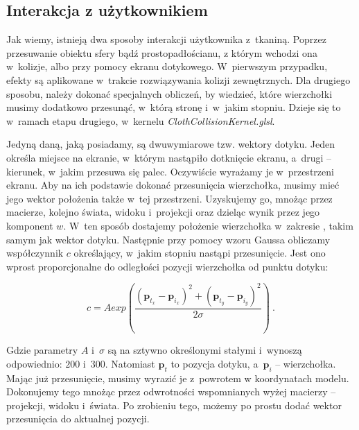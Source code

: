 		\subsection{Interakcja z użytkownikiem}
		\label{t:symulacja:dzialanie:interakcja}
			
		
		Jak wiemy, istnieją dwa sposoby interakcji użytkownika z~tkaniną. Poprzez przesuwanie obiektu sfery bądź prostopadłościanu, z którym wchodzi ona w~kolizje, albo przy pomocy ekranu dotykowego. W~pierwszym przypadku, efekty są aplikowane w~trakcie rozwiązywania kolizji zewnętrznych. Dla drugiego sposobu, należy dokonać specjalnych obliczeń, by wiedzieć, które wierzchołki musimy dodatkowo przesunąć, w~którą stronę i~w~jakim stopniu. Dzieje się to w~ramach etapu drugiego, w~kernelu \emph{ClothCollisionKernel.glsl}.
		
		Jedyną daną, jaką posiadamy, są dwuwymiarowe tzw. wektory dotyku. Jeden określa miejsce na ekranie, w~którym nastąpiło dotknięcie ekranu, a~drugi -- kierunek, w~jakim przesuwa się palec. Oczywiście wyrażamy je w~przestrzeni ekranu. Aby na ich podstawie dokonać przesunięcia wierzchołka, musimy mieć jego wektor położenia także w~tej przestrzeni. Uzyskujemy go, mnożąc przez macierze, kolejno świata, widoku i~projekcji oraz dzieląc wynik przez jego komponent \(w\). W~ten sposób dostajemy położenie wierzchołka w~zakresie \(<-1, 1>\), takim samym jak wektor dotyku. Następnie przy pomocy wzoru Gaussa obliczamy współczynnik \(c\) określający, w~jakim stopniu nastąpi przesunięcie. Jest ono wprost proporcjonalne do odległości pozycji wierzchołka od punktu dotyku:
		
		
		\begin{equation}
		c = Aexp(\frac{(\mathbf{p}_{t_{x}} - \mathbf{p}_{i_{x}})^{2} + (\mathbf{p}_{t_{y}} - \mathbf{p}_{i_{y}})^{2}}{2 \sigma}) \ .
		\end{equation} 
		
		Gdzie parametry \( A \) i~\( \sigma \) są na sztywno określonymi stałymi i~wynoszą odpowiednio: \(200\) i~\(300\). Natomiast \( \mathbf{p}_{t} \) to pozycja dotyku, a~\( \mathbf{p}_{i} \)  -- wierzchołka. Mając już przesunięcie, musimy wyrazić je z~powrotem w koordynatach modelu. Dokonujemy tego mnożąc przez odwrotności wspomnianych wyżej macierzy -- projekcji, widoku i~świata. Po zrobieniu tego, możemy po prostu dodać wektor przesunięcia do aktualnej pozycji.
		\newline
		
